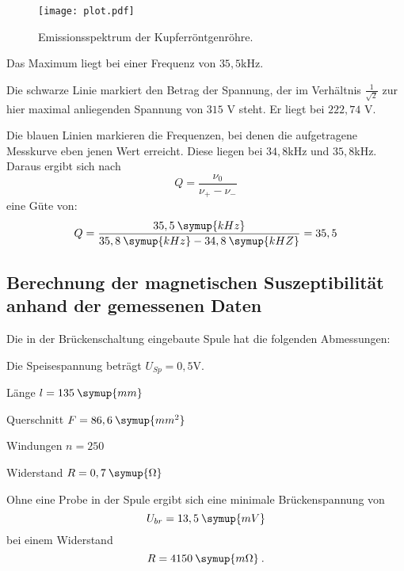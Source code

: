\begin{figure}[H]
  \centering
  \texttt{[image: plot.pdf]}
  \caption{Emissionsspektrum der Kupferröntgenröhre.}
  \label{fig:plot}
\end{figure}

Das Maximum liegt bei einer Frequenz von $35,5$kHz.

Die schwarze Linie markiert den Betrag der Spannung, der im Verhältnis $\frac{1}{\sqrt{2}}$ zur hier
maximal anliegenden Spannung von $315$ V steht. Er liegt bei $222,74$ V.

Die blauen Linien markieren die Frequenzen, bei denen die aufgetragene Messkurve eben jenen Wert
erreicht. Diese liegen bei $34,8$kHz und $35,8$kHz.
Daraus ergibt sich nach
\begin{equation*}
  Q = \frac{\nu_0}{\nu_+ - \nu_-}
\end{equation*}
eine Güte von:
\begin{equation*}
  Q = \frac{35,5\:\symup{kHz}}{35,8\:\symup{kHz} - 34,8\:\symup{kHZ}} = 35,5
\end{equation*}



\subsection{Berechnung der magnetischen Suszeptibilität anhand der gemessenen Daten}
Die in der Brückenschaltung eingebaute Spule hat die folgenden Abmessungen:

Die Speisespannung beträgt $U_{Sp} = 0,5$V.

Länge $l = 135 \: \symup{mm}$

Querschnitt $F = 86,6 \: \symup{mm^2}$

Windungen $n = 250$

Widerstand $R = 0,7 \: \symup{\Omega}$

Ohne eine Probe in der Spule ergibt sich eine minimale Brückenspannung von
\begin{equation*}
  U_{br} = 13,5 \: \symup{mV}
\end{equation*}
bei einem Widerstand
\begin{equation*}
  R = 4150 \: \symup{m\Omega} \: .
\end{equation*}

